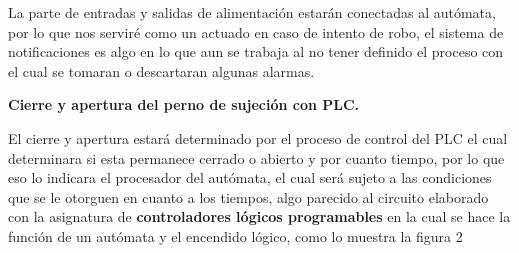 \documentclass[12pt]{article}
\begin{document}
\vspace{\baselineskip}

\vspace{\baselineskip}

\vspace{\baselineskip}

\vspace{\baselineskip}

\vspace{\baselineskip}

\vspace{\baselineskip}

\vspace{\baselineskip}

\vspace{\baselineskip}

\vspace{\baselineskip}

\vspace{\baselineskip}
{\fontsize{11pt}{13.2pt}\selectfont La parte de entradas y salidas de alimentación estarán conectadas al autómata, por lo que nos serviré como un actuado en caso de intento de robo, el sistema de notificaciones es algo en lo que aun se trabaja al no tener definido el proceso con el cual se tomaran o descartaran algunas alarmas.\par}\par


\vspace{\baselineskip}
{\fontsize{11pt}{13.2pt}\selectfont \textbf{Cierre y apertura del perno de sujeción con PLC.}\par}\par


\vspace{\baselineskip}
{\fontsize{11pt}{13.2pt}\selectfont El cierre y apertura estará determinado por el proceso de control del PLC el cual determinara si esta permanece cerrado o abierto y por cuanto tiempo, por lo que eso lo indicara el procesador del autómata, el cual será sujeto a las condiciones que se le otorguen en cuanto a los tiempos, algo parecido al circuito elaborado con la asignatura de \textbf{controladores lógicos programables }en la cual se hace la función de un autómata y el encendido lógico, como lo muestra la figura 2\par}\par


\vspace{\baselineskip}


\end{document}
